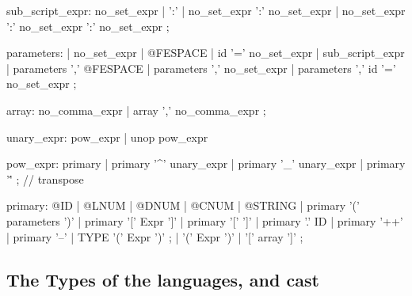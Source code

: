 \documentclass[a4paper,twoside,12pt]{book}
\begin{document}
{sub_script_expr:
	     no_set_expr
	|   ':'
	|   no_set_expr ':' no_set_expr
	|   no_set_expr ':' no_set_expr ':' no_set_expr ;


parameters:
        |   no_set_expr
        |   @FESPACE
        |   id '=' no_set_expr
        |   sub_script_expr
        |   parameters ',' @FESPACE
        |   parameters ',' no_set_expr
        |   parameters ',' id '=' no_set_expr ;

array:   no_comma_expr
       | array ',' no_comma_expr ;


unary_expr:
    pow_expr
  | unop  pow_expr %

pow_expr: primary
  |      primary  '^' unary_expr
  |      primary  '_' unary_expr
  |      primary '\''  ;    //  transpose 

primary:
           @ID
  |        @LNUM
  |        @DNUM
  |        @CNUM
  |        @STRING
  |        primary '('  parameters ')'
  |        primary '[' Expr ']'
  |        primary '['  ']'
  |        primary '.'  ID
  |        primary '++'
  |        primary '--'
  |        TYPE '('  Expr ')' ;
  |        '(' Expr ')'
  |        '[' array  ']' ;

\eFF
\subsection{The Types of the languages, and cast}

%










}
\end{document}
